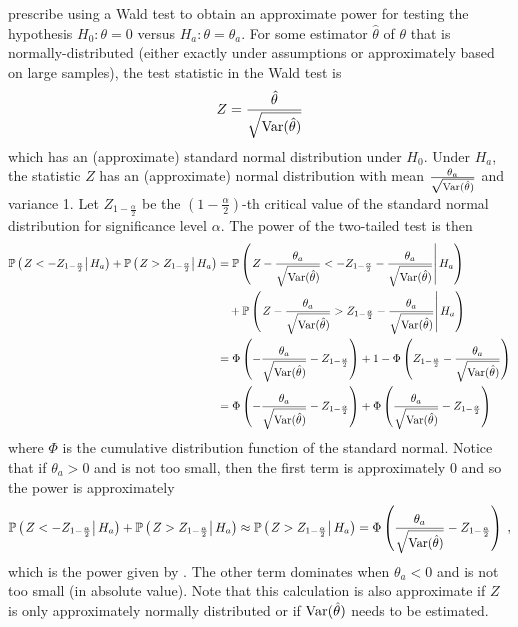 \documentclass[10pt]{article}
\begin{document}
\textcite{Hussey:2007} prescribe using a Wald test to obtain an approximate power for testing the hypothesis $H_0:\theta=0$ versus $H_a:\theta=\theta_a$. For some estimator $\hat{\theta}$ of $\theta$ that is normally-distributed (either exactly under assumptions or approximately based on large samples), the test statistic in the Wald test is
\[
Z = \frac{\hat{\theta}}{\sqrt{\mathrm{Var}(\hat{\theta})}}
\]
which has an (approximate) standard normal distribution under $H_0$. Under $H_a$, the statistic $Z$ has an (approximate) normal distribution with mean $\frac{\theta_a}{\sqrt{\mathrm{Var}(\hat{\theta})}}$ and variance 1. Let $Z_{1-\frac{\alpha}{2}}$ be the $\left(1-\frac{\alpha}{2}\right)$-th critical value of the standard normal distribution for significance level $\alpha$. The power of the two-tailed test is then
\begin{align*}
\mathbb{P}\left(\left.Z<-Z_{1-\frac{\alpha}{2}}\right|H_a\right) + \mathbb{P}\left(\left.Z>Z_{1-\frac{\alpha}{2}}\right|H_a\right) &= \mathbb{P}\left(\left.Z-\frac{\theta_a}{\sqrt{\mathrm{Var}(\hat{\theta})}}<-Z_{1-\frac{\alpha}{2}}-\frac{\theta_a}{\sqrt{\mathrm{Var}(\hat{\theta})}}\right|H_a\right) \\
&\quad + \mathbb{P}\left(\left.Z-\frac{\theta_a}{\sqrt{\mathrm{Var}(\hat{\theta})}}>Z_{1-\frac{\alpha}{2}}-\frac{\theta_a}{\sqrt{\mathrm{Var}(\hat{\theta})}}\right|H_a\right) \\
&= \Phi\left(-\frac{\theta_a}{\sqrt{\mathrm{Var}(\hat{\theta})}}-Z_{1-\frac{\alpha}{2}}\right) + 1-\Phi\left(Z_{1-\frac{\alpha}{2}}-\frac{\theta_a}{\sqrt{\mathrm{Var}(\hat{\theta})}}\right) \\
&= \Phi\left(-\frac{\theta_a}{\sqrt{\mathrm{Var}(\hat{\theta})}}-Z_{1-\frac{\alpha}{2}}\right) + \Phi\left(\frac{\theta_a}{\sqrt{\mathrm{Var}(\hat{\theta})}} - Z_{1-\frac{\alpha}{2}}\right)
\end{align*}
where $\Phi$ is the cumulative distribution function of the standard normal. Notice that if $\theta_a>0$ and is not too small, then the first term is approximately 0 and so the power is approximately 
\[
\mathbb{P}\left(\left.Z<-Z_{1-\frac{\alpha}{2}}\right|H_a\right) + \mathbb{P}\left(\left.Z>Z_{1-\frac{\alpha}{2}}\right|H_a\right) \approx \mathbb{P}\left(\left.Z>Z_{1-\frac{\alpha}{2}}\right|H_a\right) = \Phi\left(\frac{\theta_a}{\sqrt{\mathrm{Var}(\hat{\theta})}} - Z_{1-\frac{\alpha}{2}}\right) \;,
\]
which is the power given by \textcite{Hussey:2007}. The other term dominates when $\theta_a<0$ and is not too small (in absolute value). Note that this calculation is also approximate if $Z$ is only approximately normally distributed or if $\mathrm{Var}(\hat{\theta})$ needs to be estimated.
\end{document}
